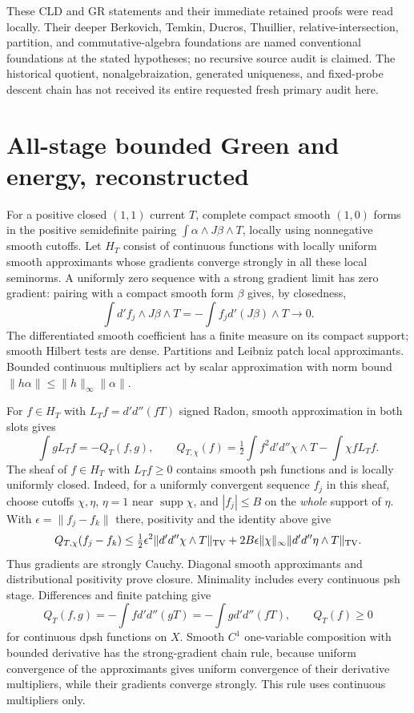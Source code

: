 \documentclass[11pt]{article}
\newcommand{\DD}{d'd''}
\theoremstyle{remark}\newtheorem{remark}[theorem]{Remark}
\begin{document}
These CLD and GR statements and their immediate retained proofs were
read locally. Their deeper Berkovich, Temkin, Ducros, Thuillier,
relative-intersection, partition, and commutative-algebra foundations
are named conventional foundations at the stated hypotheses; no
recursive source audit is claimed. The historical quotient,
nonalgebraization, generated uniqueness, and fixed-probe descent
chain has not received its entire requested fresh primary audit here.

\section{All-stage bounded Green and energy, reconstructed}
For a positive closed $(1,1)$ current $T$, complete compact smooth
$(1,0)$ forms in the positive semidefinite pairing
$\int\alpha\wedge J\beta\wedge T$, locally using nonnegative
smooth cutoffs. Let $H_T$ consist of continuous functions with locally
uniform smooth approximants whose gradients converge strongly in all
these local seminorms. A uniformly zero sequence with a strong
gradient limit has zero gradient: pairing with a compact smooth form
$\beta$ gives, by closedness,
\[
 \int d'f_j\wedge J\beta\wedge T
 =-\int f_j d'(J\beta)\wedge T\longrightarrow0.
\]
The differentiated smooth coefficient has a finite measure on its
compact support; smooth Hilbert tests are dense. Partitions and
Leibniz patch local approximants. Bounded continuous multipliers act
by scalar approximation with norm bound $\|h\alpha\|\le
\|h\|_\infty\|\alpha\|$.

For $f\in H_T$ with $L_Tf=\DD(fT)$ signed Radon, smooth
approximation in both slots gives
\[
 \int gL_Tf=-Q_T(f,g),\qquad
 Q_{T,\chi}(f)=\tfrac12\int f^2\DD\chi\wedge T-\int\chi fL_Tf.
\]
The sheaf of $f\in H_T$ with $L_Tf\ge0$ contains smooth psh
functions and is locally uniformly closed. Indeed, for a uniformly
convergent sequence $f_j$ in this sheaf, choose cutoffs $\chi,\eta$,
$\eta=1$ near $\operatorname{supp}\chi$, and $|f_j|\le B$ on the
\emph{whole} support of $\eta$. With $\epsilon=\|f_j-f_k\|$ there,
positivity and the identity above give
\[
 Q_{T,\chi}(f_j-f_k)\le
 \tfrac12\epsilon^2\|\DD\chi\wedge T\|_{\rm TV}
 +2B\epsilon\|\chi\|_\infty\|\DD\eta\wedge T\|_{\rm TV}.
\]
Thus gradients are strongly Cauchy. Diagonal smooth approximants
and distributional positivity prove closure. Minimality includes
every continuous psh stage. Differences and finite patching give
\begin{equation}\label{green}
 Q_T(f,g)=-\int f\DD(gT)=-\int g\DD(fT),\qquad Q_T(f)\ge0
\end{equation}
for continuous dpsh functions on $X$.
Smooth $C^1$ one-variable composition with bounded derivative has
the strong-gradient chain rule, because uniform convergence of
the approximants gives uniform convergence of their derivative
multipliers, while their gradients converge strongly. This rule
uses continuous multipliers only.
\end{document}
